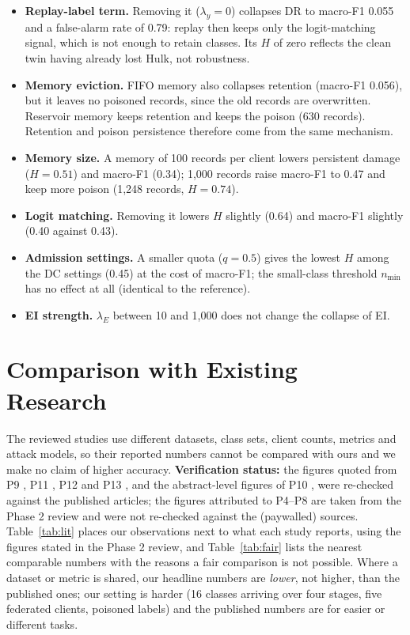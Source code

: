 \documentclass[10pt,a4paper]{article}
\begin{document}
\begin{itemize}
\item \textbf{Replay-label term.} Removing it ($\lambda_y=0$) collapses DR to macro-F1 0.055 and a false-alarm rate of 0.79: replay then keeps only the logit-matching signal, which is not enough to retain classes. Its $H$ of zero reflects the clean twin having already lost Hulk, not robustness.
\item \textbf{Memory eviction.} FIFO memory also collapses retention (macro-F1 0.056), but it leaves no poisoned records, since the old records are overwritten. Reservoir memory keeps retention and keeps the poison (630 records). Retention and poison persistence therefore come from the same mechanism.
\item \textbf{Memory size.} A memory of 100 records per client lowers persistent damage ($H=0.51$) and macro-F1 (0.34); 1,000 records raise macro-F1 to 0.47 and keep more poison (1,248 records, $H=0.74$).
\item \textbf{Logit matching.} Removing it lowers $H$ slightly (0.64) and macro-F1 slightly (0.40 against 0.43).
\item \textbf{Admission settings.} A smaller quota ($q=0.5$) gives the lowest $H$ among the DC settings (0.45) at the cost of macro-F1; the small-class threshold $n_{\min}$ has no effect at all (identical to the reference).
\item \textbf{EI strength.} $\lambda_E$ between 10 and 1,000 does not change the collapse of EI.
\end{itemize}

\section{Comparison with Existing Research}\label{sec:lit}
The reviewed studies use different datasets, class sets, client counts, metrics and attack models, so their reported numbers cannot be compared with ours and we make no claim of higher accuracy. \textbf{Verification status:} the figures quoted from P9 \cite{guo}, P11 \cite{flzt}, P12 \cite{rare} and P13 \cite{elgnn}, and the abstract-level figures of P10 \cite{amm}, were re-checked against the published articles; the figures attributed to P4--P8 are taken from the Phase 2 review and were not re-checked against the (paywalled) sources. Table~\ref{tab:lit} places our observations next to what each study reports, using the figures stated in the Phase 2 review, and Table~\ref{tab:fair} lists the nearest comparable numbers with the reasons a fair comparison is not possible. Where a dataset or metric is shared, our headline numbers are \emph{lower}, not higher, than the published ones; our setting is harder (16 classes arriving over four stages, five federated clients, poisoned labels) and the published numbers are for easier or different tasks.
\end{document}
